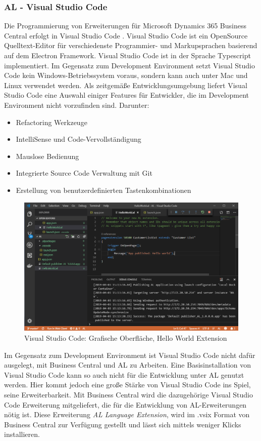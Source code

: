 \subsubsection{AL - Visual Studio Code}
Die Programmierung von Erweiterungen für Microsoft Dynamics 365 Business Central erfolgt in Visual Studio Code \cite{KahlertGiza2016}. Visual Studio Code ist ein OpenSource Quelltext-Editor für verschiedenste Programmier- und Markupsprachen basierend auf dem Electron Framework. Visual Studio Code ist in der Sprache Typescript implementiert. Im Gegensatz zum Development Environment setzt Visual Studio Code kein Windows-Betriebssystem voraus, sondern kann auch unter Mac und Linux verwendet werden. Als zeitgemäße Entwicklungsumgebung liefert Visual Studio Code eine Auswahl einiger Features für Entwickler, die im Development Environment nicht vorzufinden sind. Darunter:

\begin{itemize}
	\item Refactoring Werkzeuge
	\item IntelliSense und Code-Vervollständigung
	\item Mauslose Bedienung
	\item Integrierte Source Code Verwaltung mit Git
	\item Erstellung von benutzerdefinierten Tastenkombinationen
\end{itemize}

\begin{figure}[h]
	\centering
	\includegraphics[width=130mm]{images/VSCode}
	\caption{Visual Studio Code: Grafische Oberfläche, Hello World Extension}
	\label{fig:VSCodeGUI}
\end{figure}

\pagebreak

Im Gegensatz zum Development Environment ist Visual Studio Code nicht dafür ausgelegt, mit Business Central und AL zu Arbeiten. Eine Basisinstallation von Visual Studio Code kann so auch nicht für die Entwicklung unter AL genutzt werden. Hier kommt jedoch eine große Stärke von Visual Studio Code ins Spiel, seine Erweiterbarkeit. Mit Business Central wird die dazugehörige Visual Studio Code Erweiterung mitgeliefert, die für die Entwicklung von AL-Erweiterungen nötig ist. Diese Erweiterung \textit{AL Language Extension}, wird im .vsix Format von Business Central zur Verfügung gestellt und lässt sich mittels weniger Klicks installieren.
\linebreak

